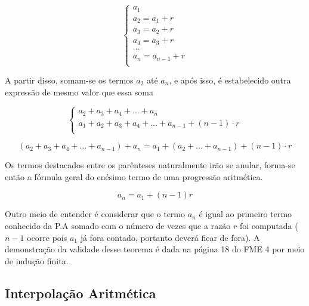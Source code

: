 \documentclass[11pt]{article}
\begin{document}
\begin{tcolorbox}[colback=LightGreen]

\begin{equation*}
\begin{cases}
  a_{1} \\
  a_{2} = a_{1} + r \\
  a_{3} = a_{2} + r \\
  a_{4} = a_{3} + r \\
  \dots \\
  a_{n} = a_{n - 1} + r \\
\end{cases}
\end{equation*}

\end{tcolorbox}

A partir disso, somam-se os termos $a_{2}$ até $a_{n}$, e após isso, é estabelecido outra expressão de mesmo valor que essa soma


\begin{tcolorbox}[colback=LightGreen]
\begin{equation*}
\begin{cases}
  a_{2} + a_{3} + a_{4} + \dots + a_{n} \\
  a_{1} + a_{2} + a_{3} + a_{4} + \dots + a_{n - 1} + (n - 1)\cdot r \\
\end{cases}
\end{equation*}

\[
  (a_{2} + a_{3} + a_{4} + \dots + a_{n - 1}) + a_{n} = a_{1} + (a_{2} + \dots + a_{n-1}) + (n - 1)\cdot r
\]
\end{tcolorbox}

Os termos destacados entre os parênteses naturalmente irão se anular, forma-se então a fórmula geral do enésimo termo de uma progressão aritmética.

\begin{tcolorbox}[colback=LightBlue]
\[a_{n} = a_{1} + (n - 1)r\]
\end{tcolorbox}

Outro meio de entender é considerar que o termo $a_{n}$ é igual ao primeiro termo conhecido da P.A somado com o número de vezes que a razão $r$ foi computada ($n - 1$ ocorre pois $a_{1}$ já fora contado, portanto deverá ficar de fora). A demonstração da validade desse teorema é dada na página 18 do FME 4 por meio de indução finita.

\subsection{Interpolação Aritmética}
\end{document}
